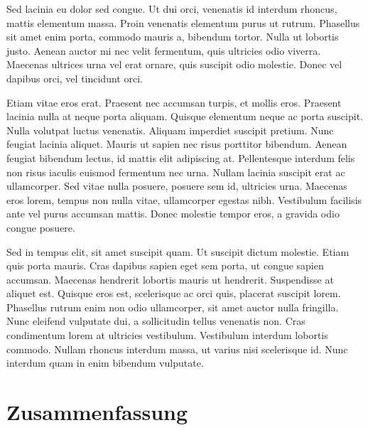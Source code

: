 \documentclass[12pt,oneside,a4paper,parskip]{scrbook}
\begin{document}
Sed lacinia eu dolor sed congue. Ut dui orci, venenatis id interdum rhoncus, mattis elementum massa. Proin venenatis elementum purus ut rutrum. Phasellus sit amet enim porta, commodo mauris a, bibendum tortor. Nulla ut lobortis justo. Aenean auctor mi nec velit fermentum, quis ultricies odio viverra. Maecenas ultrices urna vel erat ornare, quis suscipit odio molestie. Donec vel dapibus orci, vel tincidunt orci.

Etiam vitae eros erat. Praesent nec accumsan turpis, et mollis eros. Praesent lacinia nulla at neque porta aliquam. Quisque elementum neque ac porta suscipit. Nulla volutpat luctus venenatis. Aliquam imperdiet suscipit pretium. Nunc feugiat lacinia aliquet. Mauris ut sapien nec risus porttitor bibendum. Aenean feugiat bibendum lectus, id mattis elit adipiscing at. Pellentesque interdum felis non risus iaculis euismod fermentum nec urna. Nullam lacinia suscipit erat ac ullamcorper. Sed vitae nulla posuere, posuere sem id, ultricies urna. Maecenas eros lorem, tempus non nulla vitae, ullamcorper egestas nibh. Vestibulum facilisis ante vel purus accumsan mattis. Donec molestie tempor eros, a gravida odio congue posuere.

Sed in tempus elit, sit amet suscipit quam. Ut suscipit dictum molestie. Etiam quis porta mauris. Cras dapibus sapien eget sem porta, ut congue sapien accumsan. Maecenas hendrerit lobortis mauris ut hendrerit. Suspendisse at aliquet est. Quisque eros est, scelerisque ac orci quis, placerat suscipit lorem. Phasellus rutrum enim non odio ullamcorper, sit amet auctor nulla fringilla. Nunc eleifend vulputate dui, a sollicitudin tellus venenatis non. Cras condimentum lorem at ultricies vestibulum. Vestibulum interdum lobortis commodo. Nullam rhoncus interdum massa, ut varius nisi scelerisque id. Nunc interdum quam in enim bibendum vulputate.

\chapter{Zusammenfassung}


\backmatter

\listoffigures
{}

\listoftables

\end{document}
